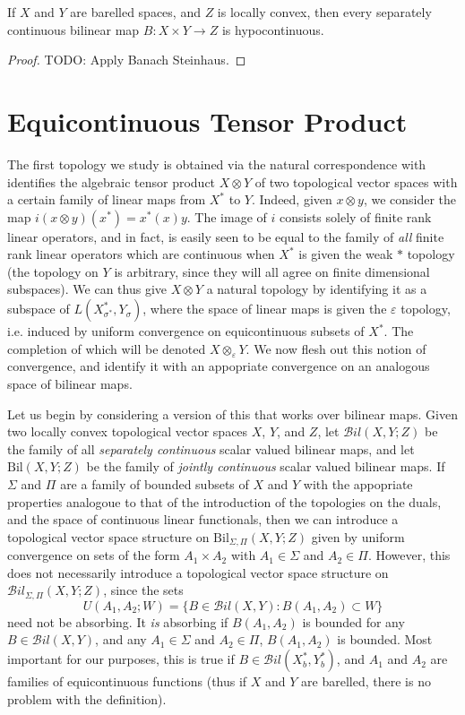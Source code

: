\begin{theorem}
    If $X$ and $Y$ are barelled spaces, and $Z$ is locally convex, then every separately continuous bilinear map $B: X \times Y \to Z$ is hypocontinuous.
\end{theorem}
\begin{proof}
    TODO: Apply Banach Steinhaus.
\end{proof}

\section{Equicontinuous Tensor Product}

The first topology we study is obtained via the natural correspondence with identifies the algebraic tensor product $X \otimes Y$ of two topological vector spaces with a certain family of linear maps from $X^*$ to $Y$. Indeed, given $x \otimes y$, we consider the map $i(x \otimes y)(x^*) = x^*(x) y$. The image of $i$ consists solely of finite rank linear operators, and in fact, is easily seen to be equal to the family of \emph{all} finite rank linear operators which are continuous when $X^*$ is given the weak $*$ topology (the topology on $Y$ is arbitrary, since they will all agree on finite dimensional subspaces). We can thus give $X \otimes Y$ a natural topology by identifying it as a subspace of $L(X^*_{\sigma^*}, Y_\sigma)$, where the space of linear maps is given the $\varepsilon$ topology, i.e. induced by uniform convergence on equicontinuous subsets of $X^*$. The completion of which will be denoted $X \widehat{\otimes_\varepsilon} Y$. We now flesh out this notion of convergence, and identify it with an appopriate convergence on an analogous space of bilinear maps.

Let us begin by considering a version of this that works over bilinear maps. Given two locally convex topological vector spaces $X$, $Y$, and $Z$, let $\mathcal{B}il(X,Y;Z)$ be the family of all \emph{separately continuous} scalar valued bilinear maps, and let $\text{Bil}(X,Y;Z)$ be the family of \emph{jointly continuous} scalar valued bilinear maps. If $\Sigma$ and $\Pi$ are a family of bounded subsets of $X$ and $Y$ with the appopriate properties analogoue to that of the introduction of the topologies on the duals, and the space of continuous linear functionals, then we can introduce a topological vector space structure on $\text{Bil}_{\Sigma,\Pi}(X,Y;Z)$ given by uniform convergence on sets of the form $A_1 \times A_2$ with $A_1 \in \Sigma$ and $A_2 \in \Pi$. However, this does not necessarily introduce a topological vector space structure on $\mathcal{B}il_{\Sigma,\Pi}(X,Y;Z)$, since the sets
%
\[ U(A_1,A_2;W) = \{ B \in \mathcal{B}il(X,Y): B(A_1, A_2) \subset W \} \]
%
need not be absorbing. It \emph{is} absorbing if $B(A_1,A_2)$ is bounded for any $B \in \mathcal{B}il(X,Y)$, and any $A_1 \in \Sigma$ and $A_2 \in \Pi$, $B(A_1,A_2)$ is bounded. Most important for our purposes, this is true if $B \in \mathcal{B}il(X^*_b, Y^*_b)$, and $A_1$ and $A_2$ are families of equicontinuous functions (thus if $X$ and $Y$ are barelled, there is no problem with the definition).

